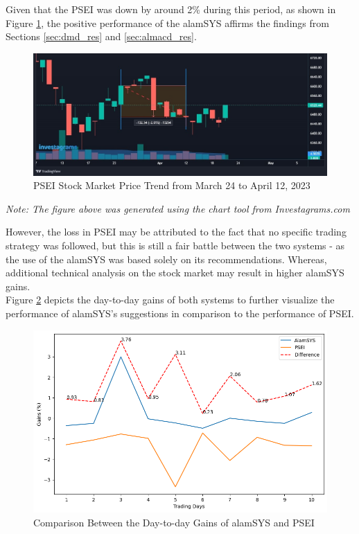 Given that the PSEI was down by around 2\% during this period, 
as shown in Figure \ref{fig:psei_actual}, the positive performance of 
the alamSYS affirms the findings from Sections \ref{sec:dmd_res} and 
\ref{sec:almacd_res}.
\begin{figure}[ht]
    \centering
    \includegraphics[width=1\textwidth]{./assets/Chapter_4/real_world/actual_PSEI.jpg}
    \caption{PSEI Stock Market Price Trend from March 24 to April 12, 2023}
    \label{fig:psei_actual}
\end{figure}
\FloatBarrier
\textit{Note: The figure above was generated using the chart tool from Investagrams.com}

However, the loss in PSEI may be attributed to the fact that no specific trading 
strategy was followed, but this is still a fair battle between the two systems - 
as the use of the alamSYS was based solely on its recommendations. Whereas, additional 
technical analysis on the stock market may result in higher alamSYS gains.
\\

Figure \ref{fig:daytoday} depicts the day-to-day gains of both systems to further visualize 
the performance of alamSYS's suggestions in comparison to the performance of 
PSEI.
\begin{figure}[ht]
    \centering
    \includegraphics[width=1\textwidth]{./assets/Chapter_4/real_world/comparison.png}
    \caption{Comparison Between the Day-to-day Gains of alamSYS and PSEI}
    \label{fig:daytoday}
\end{figure}
\FloatBarrier

